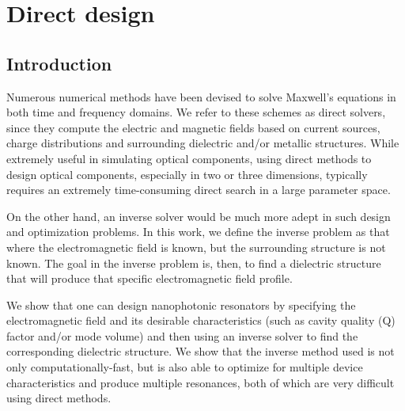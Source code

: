 % 
\chapter{Direct design}
\section{Introduction}
Numerous numerical methods have been devised to solve Maxwell's equations in both time\cite{Yee66} and frequency\cite{AB74,GA79} domains. We refer to these schemes as direct solvers, since they compute the electric and magnetic fields based on current sources, charge distributions and surrounding dielectric and/or metallic structures. While extremely useful in simulating optical components, using direct methods to design optical components, especially in two or three dimensions,  typically requires an extremely time-consuming direct search in a large parameter space\cite{Lon09,Sch02,Nod05,Lip08,SD05}.

On the other hand, an inverse solver would be much more adept in such design and optimization problems\cite{Sig04,Vuc05}. In this work, we define the inverse problem as that where the electromagnetic field is known, but the surrounding structure is not known. The goal in the inverse problem is, then, to find a dielectric structure that will produce that specific electromagnetic field profile.

We show that one can design nanophotonic resonators by specifying the electromagnetic field and its desirable characteristics (such as cavity quality (Q) factor and/or mode volume) and then using an inverse solver to find the corresponding dielectric structure. We show that the inverse method used is not only computationally-fast, but is also able to optimize for multiple device characteristics and produce multiple resonances, both of which are very difficult using direct methods. 

